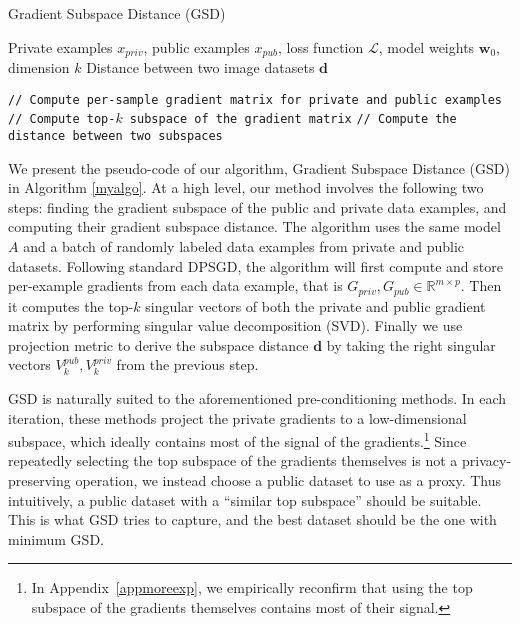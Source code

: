 \documentclass[11pt]{article}
\begin{document}
\begin{algorithm}[htbp]
    \caption{Gradient Subspace Distance (GSD)}
    \label{myalgo}
\begin{algorithmic}
     Private examples  $x_{priv}$, public examples $x_{pub}$, loss function $\mathcal{L}$, model weights $\mathbf{w}_0$, dimension $k$
     Distance between two image datasets $\boldsymbol{d}$
\end{algorithmic}
\begin{algorithmic}[1]
    \STATE \texttt{// Compute per-sample gradient matrix for private and public examples}
    \STATE \texttt{// Compute top-$k$ subspace of the gradient matrix}
    \STATE \texttt{// Compute the distance between two subspaces}
\end{algorithmic}
\end{algorithm}


We present the pseudo-code of our algorithm, Gradient Subspace Distance (GSD) in Algorithm \ref{myalgo}. At a high level, our method involves the following two steps: finding the gradient subspace of the public and private data examples, and computing their gradient subspace distance. The algorithm uses the same model $A$ and a batch of randomly labeled data examples from private and public datasets. Following standard DPSGD, the algorithm will first compute and store per-example gradients from each data example, that is $G_{priv},  G_{pub} \in \mathbb{R}^{m \times p}$. Then it computes the top-$k$ singular vectors of both the private and public gradient matrix by performing singular value decomposition (SVD). %
Finally we use projection metric to derive the subspace distance $\boldsymbol{d}$ by taking the right singular vectors $V_{k}^{pub}, V_{k}^{priv}$ from the previous step.

GSD is naturally suited to the aforementioned pre-conditioning methods.
In each iteration, these methods project the private gradients to a low-dimensional subspace, which ideally contains most of the signal of the gradients.\footnote{In Appendix~\ref{appmoreexp}, we empirically reconfirm that using the top subspace of the gradients themselves contains most of their signal.}
Since repeatedly selecting the top subspace of the gradients themselves is not a privacy-preserving operation, we instead choose a public dataset to use as a proxy.
Thus intuitively, a public dataset with a ``similar top subspace'' should be suitable.
This is what GSD tries to capture, and the best dataset should be the one with minimum GSD.
\end{document}
